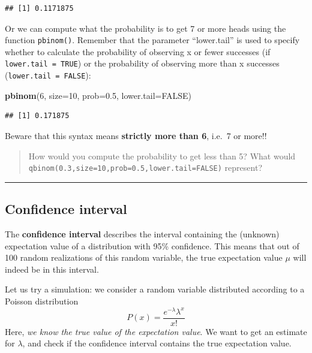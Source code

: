\documentclass[
]{book}
\newenvironment{Shaded}{\begin{snugshade}}{\end{snugshade}}
\newcommand{\AttributeTok}[1]{\textcolor[rgb]{0.13,0.29,0.53}{#1}}
\newcommand{\ConstantTok}[1]{\textcolor[rgb]{0.56,0.35,0.01}{#1}}
\newcommand{\DecValTok}[1]{\textcolor[rgb]{0.00,0.00,0.81}{#1}}
\newcommand{\FloatTok}[1]{\textcolor[rgb]{0.00,0.00,0.81}{#1}}
\newcommand{\FunctionTok}[1]{\textcolor[rgb]{0.13,0.29,0.53}{\textbf{#1}}}
\newcommand{\NormalTok}[1]{#1}
\begin{document}
\begin{verbatim}
## [1] 0.1171875
\end{verbatim}

Or we can compute what the probability is to get 7 or more heads using the function \texttt{pbinom()}. Remember that the parameter ``lower.tail'' is used to specify whether to calculate the probability of observing x or fewer successes (if \texttt{lower.tail\ =\ TRUE}) or the probability of observing more than x successes (\texttt{lower.tail\ =\ FALSE}):

\begin{Shaded}
\begin{Highlighting}[]
\FunctionTok{pbinom}\NormalTok{(}\DecValTok{6}\NormalTok{, }\AttributeTok{size=}\DecValTok{10}\NormalTok{,}
       \AttributeTok{prob=}\FloatTok{0.5}\NormalTok{,}
       \AttributeTok{lower.tail=}\ConstantTok{FALSE}\NormalTok{) }
\end{Highlighting}
\end{Shaded}

\begin{verbatim}
## [1] 0.171875
\end{verbatim}

Beware that this syntax means \textbf{strictly more than 6}, i.e.~7 or more!!

\begin{quote}
How would you compute the probability to get less than 5? What would \texttt{qbinom(0.3,size=10,prob=0.5,lower.tail=FALSE)} represent?
\end{quote}

\begin{center}\rule{0.5\linewidth}{0.5pt}\end{center}

\hypertarget{confidence-interval}{%
\subsection{Confidence interval}\label{confidence-interval}}

The \textbf{confidence interval} describes the interval containing the (unknown) expectation value of a distribution with 95\% confidence. This means that out of 100 random realizations of this random variable, the true expectation value \(\mu\) will indeed be in this interval.

Let us try a simulation: we consider a random variable distributed according to a Poisson distribution \[P(x) = \frac{{e^{ - \lambda } \lambda ^x }}{{x!}}\] Here, \emph{we know the true value of the expectation value}. We want to get an estimate for \(\lambda\), and check if the confidence interval contains the true expectation value.
\end{document}
